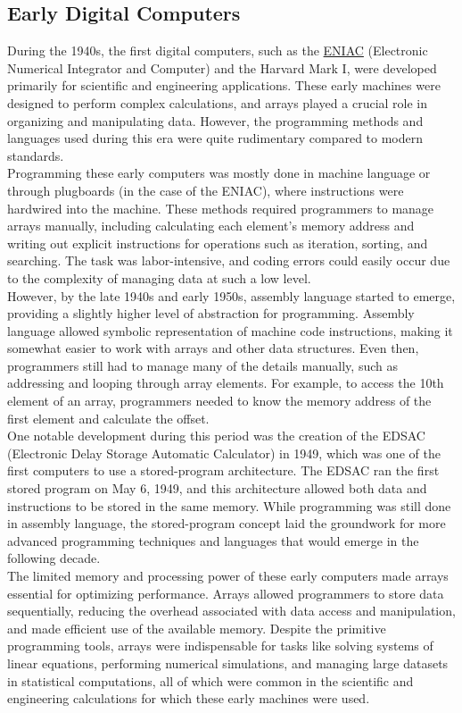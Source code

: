 \documentclass[12pt, oneside]{book}
\begin{document}
\subsection{Early Digital Computers}
During the 1940s, the first digital computers, such as the \href{https://en.wikipedia.org/wiki/ENIAC}{ENIAC} (Electronic Numerical Integrator and Computer) and the Harvard Mark I, were developed primarily for scientific and engineering applications. These early machines were designed to perform complex calculations, and arrays played a crucial role in organizing and manipulating data. However, the programming methods and languages used during this era were quite rudimentary compared to modern standards.\\Programming these early computers was mostly done in machine language or through plugboards (in the case of the ENIAC), where instructions were hardwired into the machine. These methods required programmers to manage arrays manually, including calculating each element's memory address and writing out explicit instructions for operations such as iteration, sorting, and searching. The task was labor-intensive, and coding errors could easily occur due to the complexity of managing data at such a low level.\\However, by the late 1940s and early 1950s, assembly language started to emerge, providing a slightly higher level of abstraction for programming. Assembly language allowed symbolic representation of machine code instructions, making it somewhat easier to work with arrays and other data structures. Even then, programmers still had to manage many of the details manually, such as addressing and looping through array elements. For example, to access the 10th element of an array, programmers needed to know the memory address of the first element and calculate the offset.  \\One notable development during this period was the creation of the EDSAC (Electronic Delay Storage Automatic Calculator) in 1949, which was one of the first computers to use a stored-program architecture. The EDSAC ran the first stored program on May 6, 1949, and this architecture allowed both data and instructions to be stored in the same memory. While programming was still done in assembly language, the stored-program concept laid the groundwork for more advanced programming techniques and languages that would emerge in the following decade.\\The limited memory and processing power of these early computers made arrays essential for optimizing performance. Arrays allowed programmers to store data sequentially, reducing the overhead associated with data access and manipulation, and made efficient use of the available memory. Despite the primitive programming tools, arrays were indispensable for tasks like solving systems of linear equations, performing numerical simulations, and managing large datasets in statistical computations, all of which were common in the scientific and engineering calculations for which these early machines were used.
\end{document}

